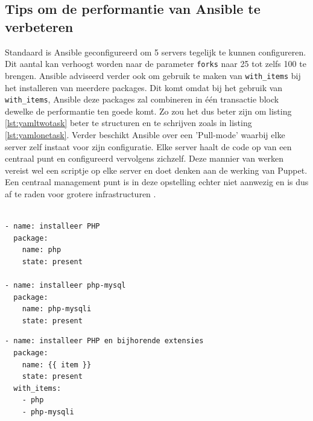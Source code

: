  \subsection{Tips om de performantie van Ansible te verbeteren}
 Standaard is Ansible geconfigureerd om 5 servers tegelijk te kunnen configureren. Dit aantal kan verhoogt worden naar de parameter \texttt{forks} naar 25 tot zelfs 100 te brengen. \newline
Ansible adviseerd verder ook om gebruik te maken van \texttt{with\_items} bij het installeren van meerdere packages. Dit komt omdat bij het gebruik van \texttt{with\_items}, Ansible deze packages zal combineren in \'e\'en transactie block dewelke de performantie ten goede komt. Zo zou het dus beter zijn om listing \ref{lst:yamltwotask} beter te structuren en te schrijven zoals in listing \ref{lst:yamlonetask}. \newline
Verder beschikt Ansible over een 'Pull-mode' waarbij elke server zelf instaat voor zijn configuratie. Elke server haalt de code op van een centraal punt en configureerd vervolgens zichzelf. Deze mannier van werken vereist wel een scriptje op elke server en doet denken aan de werking van Puppet. Een centraal management punt is in deze opstelling echter niet aanwezig en is dus af te raden voor grotere infrastructuren \autocite{AnsibleTuning} .

\begin{lstlisting}[frame=single]

- name: installeer PHP
  package:
    name: php
    state: present

- name: installeer php-mysql
  package:
    name: php-mysqli
    state: present
\end{lstlisting}

\begin{lstlisting}[frame=single]
- name: installeer PHP en bijhorende extensies
  package:
    name: {{ item }}
    state: present
  with_items:
    - php
    - php-mysqli
\end{lstlisting}

  
  
